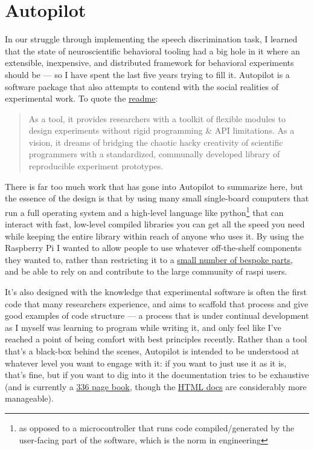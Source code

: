 \section{Autopilot}
\label{sec:autopilot}

In our struggle through implementing the speech discrimination task, I learned that the state of neuroscientific behavioral tooling had a big hole in it where an extensible, inexpensive, and distributed framework for behavioral experiments should be --- so I have spent the last five years trying to fill it\cite{saundersAutopilotAutomatingBehavioral2019}. Autopilot is a software package that also attempts to contend with the social realities of experimental work. To quote the \href{https://github.com/wehr-lab/autopilot/blob/main/README.md}{readme}:

\begin{quote}
As a tool, it provides researchers with a toolkit of flexible modules to design experiments without rigid programming \& API limitations. As a vision, it dreams of bridging the chaotic hacky creativity of scientific programmers with a standardized, communally developed library of reproducible experiment prototypes.
\end{quote}


There is far too much work that has gone into Autopilot to summarize here, but the essence of the design is that by using many small single-board computers that run a full operating system and a high-level language like python\footnote{as opposed to a microcontroller that runs code compiled/generated by the user-facing part of the software, which is the norm in engineering} that can interact with fast, low-level compiled libraries you can get all the speed you need while keeping the entire library within reach of anyone who uses it. By using the Raspberry Pi I wanted to allow people to use whatever off-the-shelf components they wanted to, rather than restricting it to a \href{https://sanworks.io/shop/products.php?productFamily=bpod}{small number of bespoke parts}, and be able to rely on and contribute to the large community of raspi users.

It's also designed with the knowledge that experimental software is often the first code that many researchers experience, and aims to scaffold that process and give good examples of code structure --- a process that is under continual development as I myself was learning to program while writing it, and only feel like I've reached a point of being comfort with best principles recently. Rather than a tool that's a black-box behind the scenes, Autopilot is intended to be understood at whatever level you want to engage with it: if you want to just use it as it is, that's fine, but if you want to dig into it the documentation tries to be exhaustive (and is currently a \href{https://docs.auto-pi-lot.com/_/downloads/en/latest/pdf/}{336 page book}, though the \href{https://docs.auto-pi-lot.com/en/latest/}{HTML docs} are considerably more manageable).

